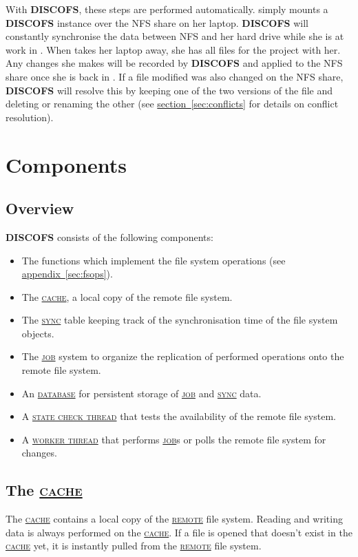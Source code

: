 \documentclass[a4paper]{article}
\newcommand{\software}[1]{\textsc{\textbf{#1}}\xspace}
\newcommand{\discofs}{\software{DISCOFS}}
\newcommand{\component}[1]{\hyperref[comp:#1]{\textsc{#1}}\xspace}
\newcommand{\job}{\component{job}}
\newcommand{\jobs}{\job{}s\xspace}
\newcommand{\sync}{\component{sync}}
\newcommand{\cache}{\component{cache}}
\newcommand{\remote}{\component{remote}}
\newcommand{\database}{\component{database}}
\newcommand{\workerthread}{\hyperref[comp:workerthread]{\textsc{worker thread}}\xspace}
\newcommand{\statecheckthread}{\hyperref[comp:statecheckthread]{\textsc{state check thread}}\xspace}
\newcommand{\sectionref}[1]{\hyperref[#1]{section~\ref{#1}}}
\begin{document}
With \discofs, these steps are performed automatically. \somename simply mounts
a \discofs instance over the NFS share on her laptop. \discofs will constantly
synchronise the data between NFS and her hard drive while she is at work in
\sometown.
When \somename takes her laptop away, she has all files for the project with
her. Any changes she makes will be recorded by \discofs and applied to the NFS
share once she is back in \sometown. If a file \somename modified was also
changed on the NFS share, \discofs will resolve this by keeping one of the two
versions of the file and deleting or renaming the other (see
\sectionref{sec:conflicts} for details on conflict resolution).


\section{Components} %

\subsection{Overview} %
\discofs consists of the following components: 

\begin{itemize}
	\item The functions which implement the file system operations (see
		\hyperref[sec:fsops]{appendix~\ref{sec:fsops}}).
	\item The \cache, a local copy of the remote file system.
	\item The \sync table keeping track of the synchronisation time of the file
		system objects.
	\item The \job system to organize the replication of performed operations
		onto the remote file system.
	\item An \database for persistent storage of \job and \sync data.
	\item A \statecheckthread that tests the availability of the remote file
		system.
	\item A \workerthread that performs \jobs or polls the remote file system
		for changes.
\end{itemize}

\subsection{The \cache} %
\label{comp:cache}
The \cache contains a local copy of the \remote file system. Reading and writing
data is always performed on the \cache. If a file is opened that doesn't exist
in the \cache yet, it is instantly pulled from the \remote file system.
\end{document}
